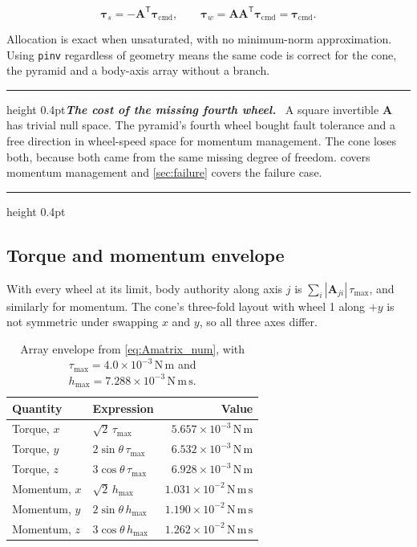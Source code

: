 \documentclass[conference,10pt,a4paper]{IEEEtran}
\newcommand{\remarkrule}{\par\nobreak\vspace{2pt}%
  \hrule height 0.4pt\vspace{4pt}\nobreak}
\newenvironment{keybox}[1][Result]
  {\par\medskip\remarkrule\noindent\small\textbf{\textit{#1.}}\ \ignorespaces}
  {\par\vspace{3pt}\hrule height 0.4pt\par\medskip\ignorespacesafterend}
\newcommand{\vect}[1]{\bm{#1}}
\newcommand{\mat}[1]{\bm{#1}}
\newcommand{\T}{^{\mathsf{T}}}
\newcommand{\unit}[1]{\ensuremath{\,\mathrm{#1}}}
\begin{document}
\begin{equation}
\vect{\tau}_s = -\mat{A}\T\vect{\tau}_\text{cmd},
\qquad
\vect{\tau}_w = \mat{A}\mat{A}\T\vect{\tau}_\text{cmd} = \vect{\tau}_\text{cmd}.
\label{eq:allocation}
\end{equation}

Allocation is exact when unsaturated, with no minimum-norm approximation. Using
\texttt{pinv} regardless of geometry means the same code is correct for the
cone, the pyramid and a body-axis array without a branch.

\begin{keybox}[The cost of the missing fourth wheel]
A square invertible $\mat{A}$ has trivial null space. The pyramid's fourth
wheel bought fault tolerance and a free direction in wheel-speed space for
momentum management. The cone loses both, because both came from the same
missing degree of freedom.  covers momentum management and
\cref{sec:failure} covers the failure case.
\end{keybox}

\subsection{Torque and momentum envelope}
\label{sec:envelope}

With every wheel at its limit, body authority along axis $j$ is
$\sum_i|\mat{A}_{ji}|\,\tau_\text{max}$, and similarly for momentum. The
cone's three-fold layout with wheel 1 along $+y$ is not symmetric under
swapping $x$ and $y$, so all three axes differ.

\begin{table}[!t]
\centering
\caption{Array envelope from \cref{eq:Amatrix_num}, with
$\tau_\text{max}=4.0\times10^{-3}\unit{N\,m}$ and
$h_\text{max}=7.288\times10^{-3}\unit{N\,m\,s}$.}
\label{tab:envelope}
\footnotesize
\begin{tabular}{@{}llr@{}}
\toprule
\textbf{Quantity} & \textbf{Expression} & \textbf{Value} \\
\midrule
Torque, $x$   & $\sqrt{2}\,\tau_\text{max}$    & $5.657\times10^{-3}\unit{N\,m}$ \\
Torque, $y$   & $2\sin\theta\,\tau_\text{max}$ & $6.532\times10^{-3}\unit{N\,m}$ \\
Torque, $z$   & $3\cos\theta\,\tau_\text{max}$ & $6.928\times10^{-3}\unit{N\,m}$ \\
Momentum, $x$ & $\sqrt{2}\,h_\text{max}$       & $1.031\times10^{-2}\unit{N\,m\,s}$ \\
Momentum, $y$ & $2\sin\theta\,h_\text{max}$    & $1.190\times10^{-2}\unit{N\,m\,s}$ \\
Momentum, $z$ & $3\cos\theta\,h_\text{max}$    & $1.262\times10^{-2}\unit{N\,m\,s}$ \\
\bottomrule
\end{tabular}
\end{table}
\end{document}
